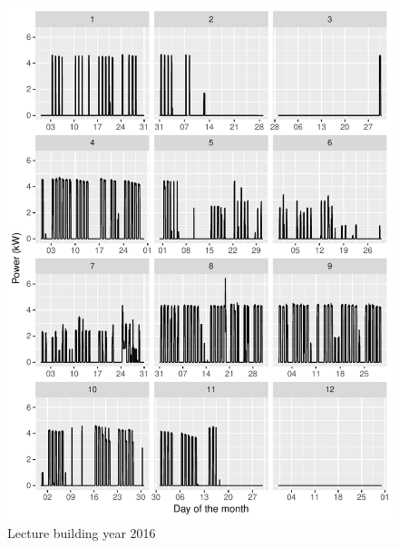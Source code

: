\documentclass[11pt, oneside]{article}   	%
\begin{document}
\begin{figure}
\includegraphics[keepaspectratio]{lecture_build_Y2016.pdf}
\caption{Lecture building year 2016 }
\end{figure}
\end{document}
